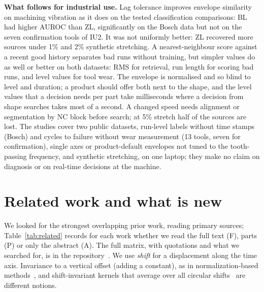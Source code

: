 \documentclass[sigconf]{acmart}
\begin{document}
\textbf{What follows for industrial use.} Lag tolerance improves envelope similarity on machining vibration as it
does on the tested classification comparisons: BL had higher AUROC than ZL, significantly on the Bosch data but not on the seven confirmation tools of IU2. It was not uniformly better: ZL recovered more sources under 1\% and 2\% synthetic stretching. A nearest-neighbour score against a recent good history separates bad runs without training, but simpler
values do as well or better on both datasets: RMS for retrieval, run length for scoring bad runs, and level values for
tool wear. The envelope is normalised and so blind to level and duration; a product should offer both next to the
shape, and the level values that a decision needs per part take milliseconds where a decision from shape searches
takes most of a second.
A changed speed needs alignment or segmentation by NC block before search; at 5\% stretch half of the sources are
lost. The studies cover two public datasets, run-level labels without time stamps (Bosch) and cycles to failure
without wear measurement (13 tools, seven for confirmation), single axes or product-default envelopes not tuned to the
tooth-passing frequency, and synthetic stretching, on one laptop; they make no claim on diagnosis or on real-time
decisions at the machine.

\section{Related work and what is new}\label{sec:related}
We looked for the strongest overlapping prior work, reading primary sources; Table~\ref{tab:related} records for each work whether we read the full text (F), parts (P) or only the abstract (A). The full matrix, with quotations and what we searched for, is in the repository~\cite{repo}. We use \emph{shift} for a displacement along the time axis. Invariance to a vertical offset (adding a constant), as in normalization-based methods~\cite{kvmatch}, and shift-invariant kernels that average over all circular shifts~\cite{grail} are different notions.
\end{document}
